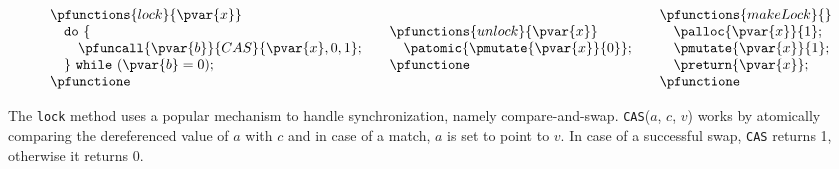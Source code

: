 \begin{figure}
\[
\begin{array}{@{}l@{\qquad}l@{\qquad}l@{}}
\begin{array}{@{}l@{}}
\pfunctions{lock}{\pvar{x}} \\
	\quad \mathtt{do}\ \{ \\
		\quad \quad \pfuncall{\pvar{b}}{CAS}{\pvar{x}, 0, 1}; \\
	\quad \}\ \mathtt{while}\ (\pvar{b} = 0); \\
\pfunctione
\end{array}
&
\begin{array}{@{}l@{}}
\pfunctions{unlock}{\pvar{x}} \\
	\quad \patomic{\pmutate{\pvar{x}}{0}}; \\
\pfunctione
\end{array}
&
\begin{array}{@{}l@{}}
\pfunctions{makeLock}{} \\
	\quad \palloc{\pvar{x}}{1}; \\
	\quad \pmutate{\pvar{x}}{1}; \\
	\quad \preturn{\pvar{x}}; \\
\pfunctione
\end{array}
\end{array}
\]
\label{fig:spinlock}
\end{figure}

The \texttt{lock} method uses a popular mechanism to handle synchronization, namely compare-and-swap. \texttt{CAS}($a$, $c$, $v$) works by atomically comparing the dereferenced value of $a$ with $c$ and in case of a match, $a$ is set to point to $v$. In case of a successful swap, \texttt{CAS} returns 1, otherwise it returns 0.


